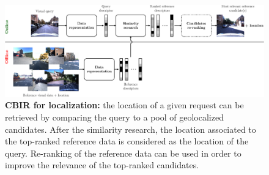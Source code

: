 \begin{figure}[t]
	\centering

	\includegraphics[width=\linewidth]{methods/cbir_for_localization}
	\caption[CBIR for localization method]{\label{fig:cbir_for_localization}\textbf{CBIR for localization:} the location of a given request can be retrieved by comparing the query to a pool of geolocalized candidates. After the similarity research, the location associated to the top-ranked reference data is considered as the location of the query. Re-ranking of the reference data can be used in order to improve the relevance of the top-ranked candidates.}
\end{figure}
